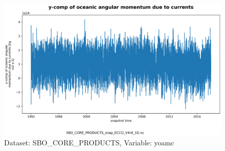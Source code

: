\begin{figure}[H]
\centering
\includegraphics[scale=0.55]{../images/plots/v4r4/oneD_plots/SBO_Core_Products/yoamc.png}
\caption{Dataset: SBO\_CORE\_PRODUCTS, Variable: yoamc}
\label{tab:table-SBO_CORE_PRODUCTS_yoamc-Plot}
\end{figure}
\newpage
\pagebreak
